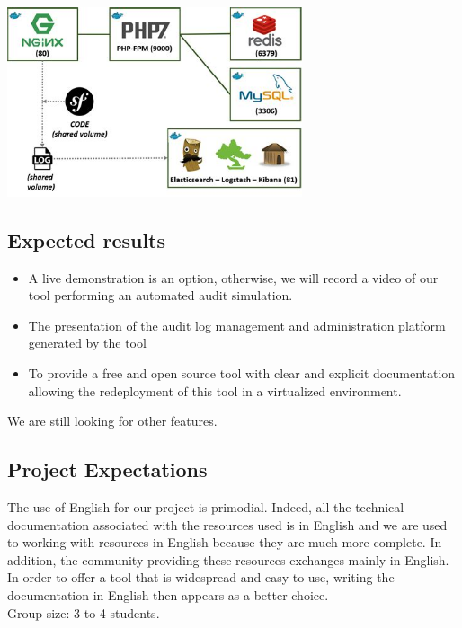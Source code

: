 \begin{itemize}
  \begin{center}

  \includegraphics[width=0.65\textwidth]{images/symfony-example.jpg}

  \end{center}


\end{itemize}
\pagebreak

\subsection{Expected results}
\begin{itemize}
\item
  A live demonstration is an option, otherwise, we will record a video 
  of our tool performing an automated audit simulation.
\item
  The presentation of the audit log management and administration platform
  generated by the tool
\item
  To provide a free and open source tool with clear and
  explicit documentation allowing the redeployment of this tool in a virtualized
    environment.
\end{itemize}

We are still looking for other features.

\vspace{1cm}

\subsection{Project Expectations}
The use of English for our project is primodial. Indeed, all the technical
documentation associated with the resources used is in English and we are used
to working with resources in English because they are much more complete. In
addition, the community providing these resources exchanges mainly in English. In order
to offer a tool that is widespread and easy to use, writing the
documentation in English then appears as a better choice. \\
Group size: 3 to 4 students.

